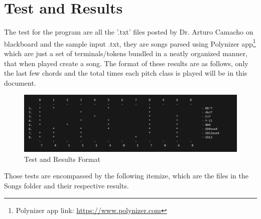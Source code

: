 \documentclass{article}
\begin{document}
\section{Test and Results} \label{fig:Results}
The test for the program are all the '.txt' files posted by Dr. Arturo Camacho on blackboard and the sample input .txt, they are songs parsed using Polynizer app\footnote{Polynizer app link: \url{https://www.polynizer.com}} which are just a set of terminals/tokens bundled in a neatly organized manner, that when played create a song. The format of these results are as follows, only the last few chords and the total times each pitch class is played will be in this document.
\begin{figure}[H]
    \centering
    \includegraphics[width=1\textwidth]{Image_SampleOutput.png}
    \caption{Test and Results Format}
\end{figure}
Those tests are encompassed by the following itemize, which are the files in the Songs folder and their respective results. 
\end{document}
